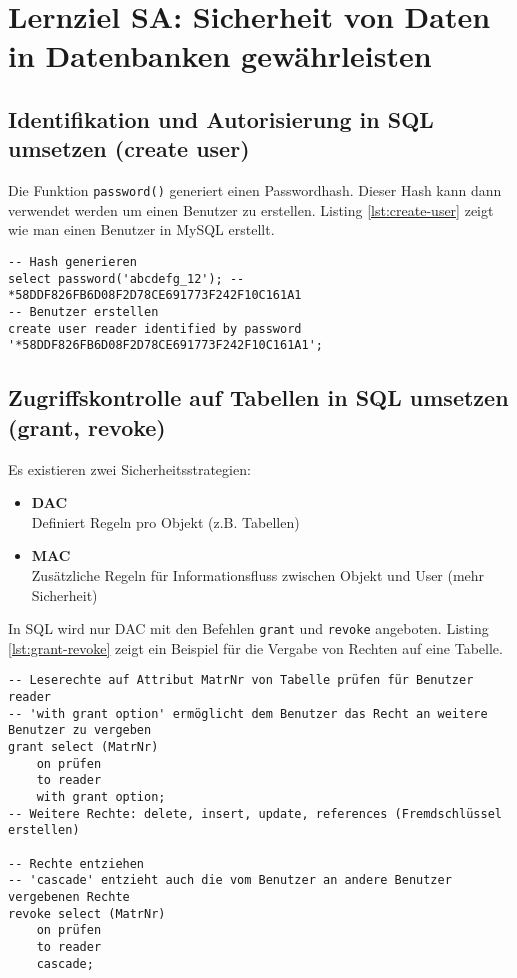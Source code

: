 \section{Lernziel SA: Sicherheit von Daten in Datenbanken gewährleisten}

\subsection{Identifikation und Autorisierung in SQL umsetzen (create user)}

Die Funktion \texttt{password()} generiert einen Passwordhash. Dieser Hash kann dann verwendet werden um einen Benutzer zu erstellen. Listing \ref{lst:create-user} zeigt wie man einen Benutzer in MySQL erstellt.

\begin{lstlisting}[caption={Benutzer erstellen},label=lst:create-user]
-- Hash generieren
select password('abcdefg_12'); -- *58DDF826FB6D08F2D78CE691773F242F10C161A1
-- Benutzer erstellen
create user reader identified by password '*58DDF826FB6D08F2D78CE691773F242F10C161A1';
\end{lstlisting}

\subsection{Zugriffskontrolle auf Tabellen in SQL umsetzen (grant, revoke)}

Es existieren zwei Sicherheitsstrategien:

\begin{itemize}
	\item \textbf{\ac{DAC}} \\
		  Definiert Regeln pro Objekt (z.B. Tabellen)
	\item \textbf{\ac{MAC}} \\
		  Zusätzliche Regeln für Informationsfluss zwischen Objekt und User (mehr Sicherheit)
\end{itemize}

In SQL wird nur \ac{DAC} mit den Befehlen \texttt{grant} und \texttt{revoke} angeboten. Listing \ref{lst:grant-revoke} zeigt ein Beispiel für die Vergabe von Rechten auf eine Tabelle.

\begin{lstlisting}[caption={Rechte auf Tabelle},label=lst:grant-revoke]
-- Leserechte auf Attribut MatrNr von Tabelle prüfen für Benutzer reader
-- 'with grant option' ermöglicht dem Benutzer das Recht an weitere Benutzer zu vergeben
grant select (MatrNr)
	on prüfen
	to reader
	with grant option;
-- Weitere Rechte: delete, insert, update, references (Fremdschlüssel erstellen)

-- Rechte entziehen
-- 'cascade' entzieht auch die vom Benutzer an andere Benutzer vergebenen Rechte
revoke select (MatrNr)
	on prüfen
	to reader
	cascade;
\end{lstlisting}

